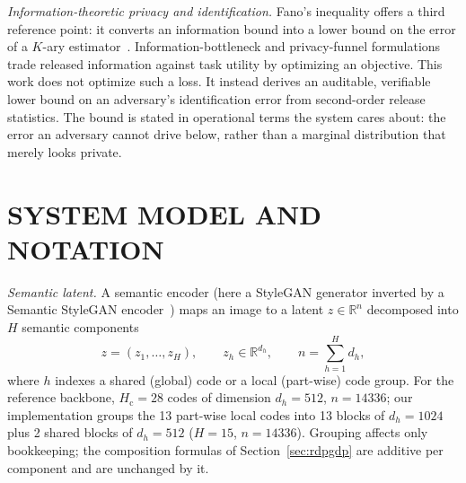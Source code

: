 \documentclass{ieeetj}
\theoremstyle{plain}
\theoremstyle{definition}
\begin{document}
\emph{Information-theoretic privacy and identification.} Fano's inequality offers a third reference point: it converts an information bound
into a lower bound on the error of a $K$-ary estimator~\cite{fano}. Information-bottleneck and
privacy-funnel formulations~\cite{privacyfunnel} trade released information against task utility by
optimizing an objective. This work does not optimize such a loss. It instead derives an
auditable, verifiable lower bound on an adversary's identification error from
second-order release statistics. The bound is stated in operational terms the system
cares about: the error an adversary cannot drive below, rather than a marginal
distribution that merely looks private.

\section{SYSTEM MODEL AND NOTATION}
\label{sec:setup}

\emph{Semantic latent.} A semantic encoder (here a StyleGAN generator inverted
by a Semantic StyleGAN encoder~\cite{semanticstylegan}) maps an image to a
latent $z\in\mathbb{R}^{n}$ decomposed into $H$ semantic components
\begin{equation}
 z=(z_1,\dots,z_H),\qquad z_h\in\mathbb{R}^{d_h},\qquad
 n=\textstyle\sum_{h=1}^{H} d_h ,
\label{eq:decomp}
\end{equation}
where $h$ indexes a shared (global) code or a local (part-wise) code group.
For the reference backbone, $H_{\mathrm c}=28$ codes of dimension
$d_h=512$, $n=14336$; our implementation groups the 13 part-wise local codes
into 13 blocks of $d_h=1024$ plus 2 shared blocks of $d_h=512$ ($H=15$,
$n=14336$). Grouping affects only bookkeeping; the composition formulas of
Section~\ref{sec:rdpgdp} are additive per component and are unchanged by it.
\end{document}
